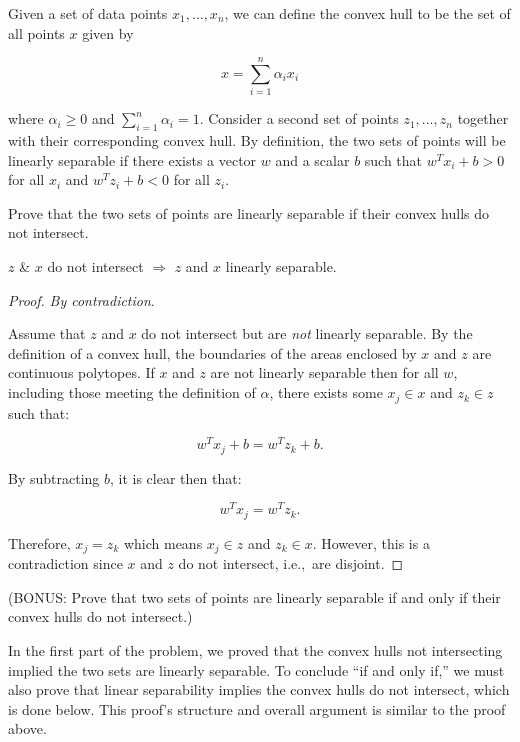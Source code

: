 \begin{problem}
Given a set of data points $x_1,\ldots,x_n$, we can define the convex hull to be the set of all points $x$ given by

\[x = \sum_{i=1}^{n} \alpha_i x_i \]

\noindent
where $\alpha_{i} \geq 0$ and $\sum_{i=1}^{n} \alpha_i = 1$. Consider a second set of points $z_1,\ldots,z_n$ together with their corresponding convex hull. By definition, the two sets of points will be linearly separable if there exists a vector $w$ and a scalar $b$ such that $w^{T}x_i + b > 0$ for all $x_i$ and $w^{T}z_i + b < 0$ for all $z_i$.

Prove that the two sets of points are linearly separable if their convex hulls do not intersect.
\end{problem}

\begin{lemma}
  $z$ \& $x$ do not intersect $\Rightarrow$ $z$ and $x$ linearly separable.
\end{lemma}

\begin{proof}
  \textit{By contradiction}.

  Assume that $z$ and $x$ do not intersect but are \textit{not} linearly separable.  By the definition of a convex hull, the boundaries of the areas enclosed by $x$ and $z$ are continuous polytopes.  If $x$ and $z$ are not linearly separable then for all $w$, including those meeting the definition of $\alpha$, there exists some $x_j \in x$ and $z_k \in z$ such that:

  \[w^{T}x_j + b = w^{T}z_k +b \text{.} \]

\noindent
By subtracting $b$, it is clear then that:

\[w^{T}x_j  = w^{T}z_k \text{.} \]

\noindent
Therefore, $x_j = z_k$ which means $x_j\in z$ and $z_k \in x$.  However, this is a contradiction since $x$ and $z$ do not intersect, i.e.,~are disjoint.

\end{proof}

\begin{subproblem}
  (BONUS\@: Prove that two sets of points are linearly separable if and only if their convex hulls do not intersect.)
\end{subproblem}

In the first part of the problem, we proved that the convex hulls not intersecting implied the two sets are linearly separable.  To conclude ``if and only if,'' we must also prove that linear separability implies the convex hulls do not intersect, which is done below.  This proof's structure and overall argument is similar to the proof above.

